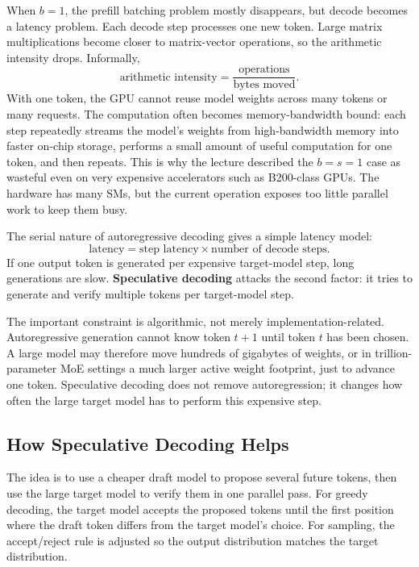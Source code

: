 \documentclass[11pt]{article}
\begin{document}
When \(b=1\), the prefill batching problem mostly disappears, but decode becomes a latency problem.  Each decode step processes one new token.  Large matrix multiplications become closer to matrix-vector operations, so the arithmetic intensity drops.  Informally,
\[
  \text{arithmetic intensity} = \frac{\text{operations}}{\text{bytes moved}}.
\]
With one token, the GPU cannot reuse model weights across many tokens or many requests.  The computation often becomes memory-bandwidth bound: each step repeatedly streams the model's weights from high-bandwidth memory into faster on-chip storage, performs a small amount of useful computation for one token, and then repeats.  This is why the lecture described the \(b=s=1\) case as wasteful even on very expensive accelerators such as B200-class GPUs.  The hardware has many SMs, but the current operation exposes too little parallel work to keep them busy.

The serial nature of autoregressive decoding gives a simple latency model:
\[
  \text{latency} = \text{step latency} \times \text{number of decode steps}.
\]
If one output token is generated per expensive target-model step, long generations are slow.  \textbf{Speculative decoding} attacks the second factor: it tries to generate and verify multiple tokens per target-model step.

The important constraint is algorithmic, not merely implementation-related.  Autoregressive generation cannot know token \(t+1\) until token \(t\) has been chosen.  A large model may therefore move hundreds of gigabytes of weights, or in trillion-parameter MoE settings a much larger active weight footprint, just to advance one token.  Speculative decoding does not remove autoregression; it changes how often the large target model has to perform this expensive step.

\subsection{How Speculative Decoding Helps}

The idea is to use a cheaper draft model to propose several future tokens, then use the large target model to verify them in one parallel pass.  For greedy decoding, the target model accepts the proposed tokens until the first position where the draft token differs from the target model's choice.  For sampling, the accept/reject rule is adjusted so the output distribution matches the target distribution.
\end{document}
